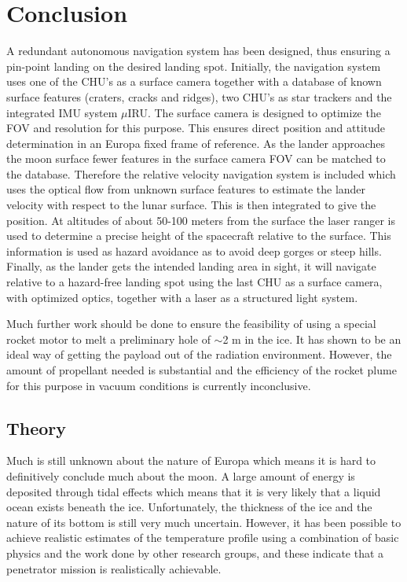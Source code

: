 \chapter{Conclusion}


A redundant autonomous navigation system has been designed, thus ensuring a pin-point landing on the desired landing spot. Initially, the navigation system uses one of the CHU's as a surface camera together with a database of known surface features (craters, cracks and ridges), two CHU's as star trackers and the integrated IMU system $\mu$IRU. The surface camera is designed to optimize the FOV and resolution for this purpose. This ensures direct position and attitude determination in an Europa fixed frame of reference.
As the lander approaches the moon surface fewer features in the surface camera FOV
can be matched to the database. Therefore the relative velocity navigation system is included
which uses the optical flow from unknown surface features to estimate
the lander velocity with respect to the lunar surface. This is then integrated to give the
position. At altitudes of about 50-100 meters from the surface the laser ranger is used to determine a precise height of the spacecraft relative to the surface. This information is used as hazard avoidance as to avoid deep gorges or steep hills. Finally, as the lander gets the intended landing area in sight, it will navigate
relative to a hazard-free landing spot using the last CHU as a surface camera, with optimized optics, together with a laser as a structured light system. 

Much further work should be done to ensure the feasibility of using a special rocket motor to melt a preliminary hole of $\sim$2 m in the ice. It has shown to be an ideal way of getting the payload out of the radiation environment. However, the amount of propellant needed is substantial and the efficiency of the rocket plume for this purpose in vacuum conditions is currently inconclusive.

\section{Theory}
Much is still unknown about the nature of Europa which means it is hard to definitively conclude much about the moon. A large amount of energy is deposited through tidal effects which means that it is very likely that a liquid ocean exists beneath the ice. Unfortunately, the thickness of the ice and the nature of its bottom is still very much uncertain. However, it has been possible to achieve realistic estimates of the temperature profile using a combination of basic physics and the work done by other research groups, and these indicate that a penetrator mission is realistically achievable. 

